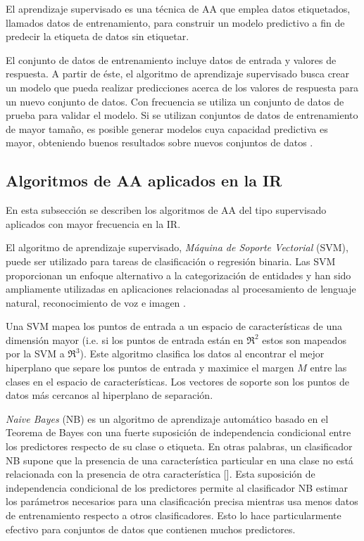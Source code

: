 \documentclass[journal]{IEEEtran}
\begin{document}
El aprendizaje supervisado es una técnica de AA que emplea datos etiquetados, llamados datos de entrenamiento, para construir un modelo predictivo a fin de predecir la etiqueta de datos sin etiquetar.

El conjunto de datos de entrenamiento incluye datos de entrada y valores de respuesta. A partir de éste, el algoritmo de aprendizaje supervisado busca crear un modelo que pueda realizar predicciones acerca de los valores de respuesta para un nuevo conjunto de datos. Con frecuencia se utiliza un conjunto de datos de prueba para validar el modelo. Si se utilizan conjuntos de datos de entrenamiento de mayor tamaño, es posible generar modelos cuya capacidad predictiva es mayor, obteniendo buenos resultados sobre nuevos conjuntos de datos \cite{Darnstadt2014}.

\subsection{Algoritmos de AA aplicados en la IR}

En esta subsección se describen los algoritmos de AA del tipo supervisado aplicados con mayor frecuencia en la IR. 

El algoritmo de aprendizaje supervisado, \textit{Máquina de Soporte Vectorial} (SVM), puede ser utilizado para tareas de clasificación o regresión binaria. Las SVM proporcionan un enfoque alternativo a la categorización de entidades y han sido ampliamente utilizadas en aplicaciones relacionadas al procesamiento de lenguaje natural, reconocimiento de voz e imagen \cite{Asghar2010}.

Una SVM mapea los puntos de entrada a un espacio de características de una dimensión mayor (i.e. si los puntos de entrada están en \(ℜ^2\) estos son mapeados por la SVM a \(ℜ^3\)). Este algoritmo clasifica los datos al encontrar el mejor hiperplano que separe los puntos de entrada y maximice el margen \( M \) entre las clases en el espacio de características.  Los vectores de soporte son los puntos de datos más cercanos al hiperplano de separación.

\textit{Naive Bayes} (NB) es un algoritmo de aprendizaje automático basado en el Teorema de Bayes con una fuerte suposición de independencia condicional entre los predictores respecto de su clase o etiqueta. En otras palabras, un clasificador NB supone que la presencia de una característica particular en una clase no está relacionada con la presencia de otra característica []. Esta suposición de independencia condicional de los predictores permite al clasificador NB estimar los parámetros necesarios para una clasificación precisa mientras usa menos datos de entrenamiento respecto a otros clasificadores. Esto lo hace particularmente efectivo para conjuntos de datos que contienen muchos predictores. 
\end{document}

